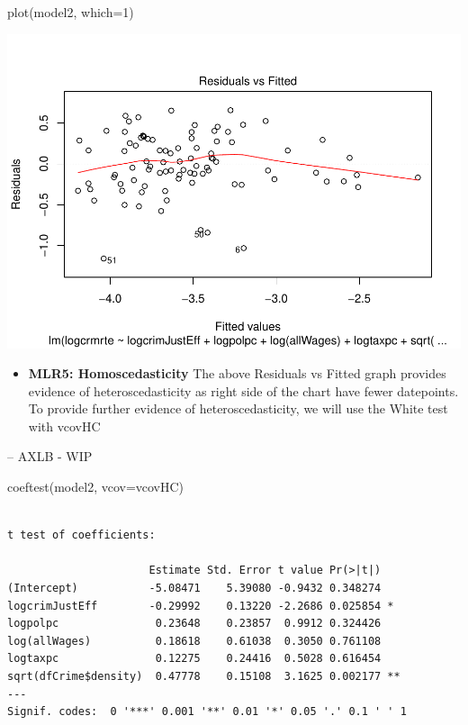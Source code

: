 \documentclass[]{article}
\newenvironment{Shaded}{}{}
\newcommand{\DataTypeTok}[1]{#1}
\newcommand{\DecValTok}[1]{#1}
\newcommand{\KeywordTok}[1]{\textcolor[rgb]{0.00,0.00,1.00}{#1}}
\newcommand{\NormalTok}[1]{#1}
\providecommand{\tightlist}{%
  \setlength{\itemsep}{0pt}\setlength{\parskip}{0pt}}
\begin{document}
\begin{Shaded}
\begin{Highlighting}[]
\KeywordTok{plot}\NormalTok{(model2, }\DataTypeTok{which=}\DecValTok{1}\NormalTok{)}
\end{Highlighting}
\end{Shaded}

\includegraphics{Bagnard_Gaustad_Hartman_Leung_Lab_3_files/figure-latex/unnamed-chunk-93-1.pdf}

\begin{itemize}
\tightlist
\item
  \textbf{MLR5: Homoscedasticity} The above Residuals vs Fitted graph
  provides evidence of heteroscedasticity as right side of the chart
  have fewer datepoints. To provide further evidence of
  heteroscedasticity, we will use the White test with vcovHC
\end{itemize}

-- AXLB - WIP

\begin{Shaded}
\begin{Highlighting}[]
\KeywordTok{coeftest}\NormalTok{(model2, }\DataTypeTok{vcov=}\NormalTok{vcovHC)}
\end{Highlighting}
\end{Shaded}

\begin{verbatim}

t test of coefficients:

                      Estimate Std. Error t value Pr(>|t|)   
(Intercept)           -5.08471    5.39080 -0.9432 0.348274   
logcrimJustEff        -0.29992    0.13220 -2.2686 0.025854 * 
logpolpc               0.23648    0.23857  0.9912 0.324426   
log(allWages)          0.18618    0.61038  0.3050 0.761108   
logtaxpc               0.12275    0.24416  0.5028 0.616454   
sqrt(dfCrime$density)  0.47778    0.15108  3.1625 0.002177 **
---
Signif. codes:  0 '***' 0.001 '**' 0.01 '*' 0.05 '.' 0.1 ' ' 1
\end{verbatim}
\end{document}
